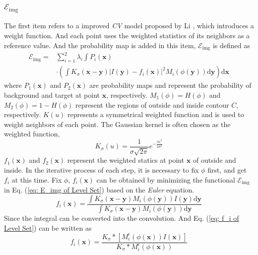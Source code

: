 \subsubsection{$\mathcal{E}_{\text{img}}$}
The first item refers to a improved \emph{CV} model proposed by Li \cite{LevelSet:mathod:li2008minimization}, which introduces a weight function. And each point uses the weighted statistics of its neighbors as a reference value. And the probability map is added in this item, $\mathcal{E}_{\text{img}}$ is defined as
\begin{equation}\label{eq: E_img of Level Set}
\begin{split}
    \mathcal{E}_{\text{img}} = &\sum_{i=1}^2 \lambda_i\int P_i(\mathbf{x}) \\
    & \cdot \left( \int K_\sigma(\mathbf{x}-\mathbf{y})\left| I(\mathbf{y}) - f_i(\mathbf{x}) \right|^2 M_i(\phi(\mathbf{y}))\mathrm{d}\mathbf{y} \right)\mathrm{d}\mathbf{x}
\end{split}
\end{equation}
where $P_1(\mathbf{x})$ and $P_2(\mathbf{x})$ are probability maps and represent the probability of background and target at point $\mathbf{x}$, respectively. $M_1(\phi) = H(\phi)$ and $M_2(\phi) = 1-H(\phi)$ represent the regions of outside and inside contour $C$, respectively. $K(u)$ represents a symmetrical weighted function and is used to weight neighbors of each point. The Gaussian kernel is often chosen as the weighted function,
\begin{equation}\label{eq: gaussian sigma}
    K_\sigma(u) = \frac{1}{\sigma\sqrt{2\pi}}e^{-\frac{|u|^2}{2\sigma^2}}
\end{equation}
$f_1(\mathbf{x})$ and $f_2(\mathbf{x})$ represent the weighted statics at point $\mathbf{x}$ of outside and inside. In the iterative process of each step, it is necessary to fix $\phi$ first, and get $f_i$ at this time. Fix $\phi$, $f_i(\mathbf{x})$ can be obtained by minimizing the functional $\mathcal{E}_{\text{img}}$ in Eq. (\ref{eq: E_img of Level Set}) based on the \emph{Euler} equation.
\begin{equation}\label{eq: f_i of Level Set}
    f_i(\mathbf{x}) = \frac{\int K_\sigma(\mathbf{x}-\mathbf{y})M_i(\phi(\mathbf{y}))I(\mathbf{y})\mathrm{d}\mathbf{y}}
    {\int K_\sigma(\mathbf{x}-\mathbf{y})M_i(\phi(\mathbf{y}))\mathrm{d}\mathbf{y}}
\end{equation}
Since the integral can be converted into the convolution. And Eq. (\ref{eq: f_i of Level Set}) can be written as
\begin{equation}
    f_i(\mathbf{x}) =
    \frac{K_\sigma \ast \left[ M_i^\epsilon(\phi(\mathbf{x})) I(\mathbf{x}) \right] }
    {K_\sigma \ast M_i^\epsilon(\phi(\mathbf{x}))}
\end{equation}
